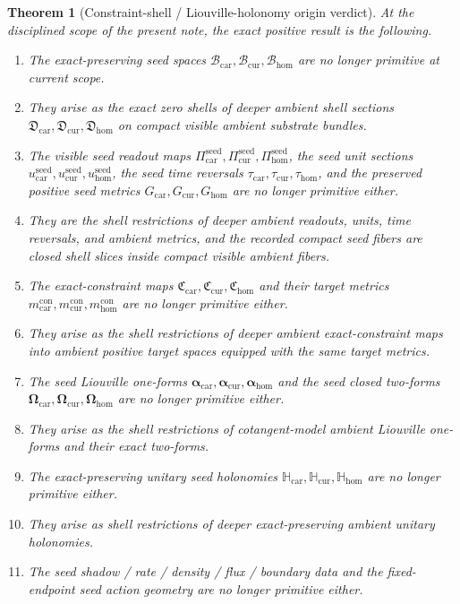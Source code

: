 \documentclass[11pt]{article}
\newcommand{\TensorSeedSpace}{\mathcal B_{\mathrm{car}}}
\newcommand{\CurSeedSpace}{\mathcal B_{\mathrm{cur}}}
\newcommand{\HomSeedSpace}{\mathcal B_{\mathrm{hom}}}
\newcommand{\TensorSeedRead}{\Pi_{\mathrm{car}}^{\mathrm{seed}}}
\newcommand{\CurSeedRead}{\Pi_{\mathrm{cur}}^{\mathrm{seed}}}
\newcommand{\HomSeedRead}{\Pi_{\mathrm{hom}}^{\mathrm{seed}}}
\newcommand{\TensorSeedUnit}{u_{\mathrm{car}}^{\mathrm{seed}}}
\newcommand{\CurSeedUnit}{u_{\mathrm{cur}}^{\mathrm{seed}}}
\newcommand{\HomSeedUnit}{u_{\mathrm{hom}}^{\mathrm{seed}}}
\newcommand{\TensorSeedTimeRev}{\tau_{\mathrm{car}}}
\newcommand{\CurSeedTimeRev}{\tau_{\mathrm{cur}}}
\newcommand{\HomSeedTimeRev}{\tau_{\mathrm{hom}}}
\newcommand{\TensorSeedMetric}{G_{\mathrm{car}}}
\newcommand{\CurSeedMetric}{G_{\mathrm{cur}}}
\newcommand{\HomSeedMetric}{G_{\mathrm{hom}}}
\newcommand{\TensorConstraintMetric}{m_{\mathrm{car}}^{\mathrm{con}}}
\newcommand{\CurConstraintMetric}{m_{\mathrm{cur}}^{\mathrm{con}}}
\newcommand{\HomConstraintMetric}{m_{\mathrm{hom}}^{\mathrm{con}}}
\newcommand{\TensorConstraintMap}{\mathfrak C_{\mathrm{car}}}
\newcommand{\CurConstraintMap}{\mathfrak C_{\mathrm{cur}}}
\newcommand{\HomConstraintMap}{\mathfrak C_{\mathrm{hom}}}
\newcommand{\TensorSeedLiouville}{\boldsymbol{\alpha}_{\mathrm{car}}}
\newcommand{\CurSeedLiouville}{\boldsymbol{\alpha}_{\mathrm{cur}}}
\newcommand{\HomSeedLiouville}{\boldsymbol{\alpha}_{\mathrm{hom}}}
\newcommand{\TensorSeedSymplectic}{\boldsymbol{\Omega}_{\mathrm{car}}}
\newcommand{\CurSeedSymplectic}{\boldsymbol{\Omega}_{\mathrm{cur}}}
\newcommand{\HomSeedSymplectic}{\boldsymbol{\Omega}_{\mathrm{hom}}}
\newcommand{\TensorSeedTransport}{\mathbb H_{\mathrm{car}}}
\newcommand{\CurSeedTransport}{\mathbb H_{\mathrm{cur}}}
\newcommand{\HomSeedTransport}{\mathbb H_{\mathrm{hom}}}
\newcommand{\TensorShellSection}{\mathfrak D_{\mathrm{car}}}
\newcommand{\CurShellSection}{\mathfrak D_{\mathrm{cur}}}
\newcommand{\HomShellSection}{\mathfrak D_{\mathrm{hom}}}
\newtheorem{theorem}{Theorem}
\begin{document}
\begin{theorem}[Constraint-shell / Liouville-holonomy origin verdict]
\label{thm:verdict}
At the disciplined scope of the present note, the exact positive result is the following.
\begin{enumerate}
    \item The exact-preserving seed spaces \(\TensorSeedSpace,\CurSeedSpace,\HomSeedSpace\) are no longer primitive at current scope.
    \item They arise as the exact zero shells of deeper ambient shell sections \(\TensorShellSection,\CurShellSection,\HomShellSection\) on compact visible ambient substrate bundles.
    \item The visible seed readout maps \(\TensorSeedRead,\CurSeedRead,\HomSeedRead\), the seed unit sections \(\TensorSeedUnit,\CurSeedUnit,\HomSeedUnit\), the seed time reversals \(\TensorSeedTimeRev,\CurSeedTimeRev,\HomSeedTimeRev\), and the preserved positive seed metrics \(\TensorSeedMetric,\CurSeedMetric,\HomSeedMetric\) are no longer primitive either.
    \item They are the shell restrictions of deeper ambient readouts, units, time reversals, and ambient metrics, and the recorded compact seed fibers are closed shell slices inside compact visible ambient fibers.
    \item The exact-constraint maps \(\TensorConstraintMap,\CurConstraintMap,\HomConstraintMap\) and their target metrics \(\TensorConstraintMetric,\CurConstraintMetric,\HomConstraintMetric\) are no longer primitive either.
    \item They arise as the shell restrictions of deeper ambient exact-constraint maps into ambient positive target spaces equipped with the same target metrics.
    \item The seed Liouville one-forms \(\TensorSeedLiouville,\CurSeedLiouville,\HomSeedLiouville\) and the seed closed two-forms \(\TensorSeedSymplectic,\CurSeedSymplectic,\HomSeedSymplectic\) are no longer primitive either.
    \item They arise as the shell restrictions of cotangent-model ambient Liouville one-forms and their exact two-forms.
    \item The exact-preserving unitary seed holonomies \(\TensorSeedTransport,\CurSeedTransport,\HomSeedTransport\) are no longer primitive either.
    \item They arise as shell restrictions of deeper exact-preserving ambient unitary holonomies.
    \item The seed shadow / rate / density / flux / boundary data and the fixed-endpoint seed action geometry are no longer primitive either.

\end{enumerate}
\end{theorem}
\end{document}
